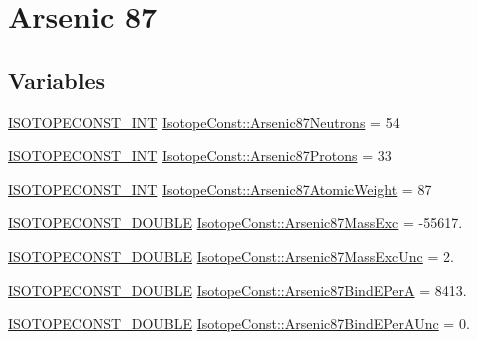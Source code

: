 \hypertarget{group___isotope_const-_arsenic-_as87}{}\section{Arsenic 87}
\label{group___isotope_const-_arsenic-_as87}
\subsection*{Variables}
\begin{DoxyCompactItemize}
\item 
\mbox{\hyperlink{group___isotope_const-_macros_ga5f18360b3e99483a35c32d789e62621c}{I\+S\+O\+T\+O\+P\+E\+C\+O\+N\+S\+T\+\_\+\+I\+NT}} \mbox{\hyperlink{group___isotope_const-_arsenic-_as87_ga909cc82bd9a37b38618f65f01b3d8ae9}{Isotope\+Const\+::\+Arsenic87\+Neutrons}} = 54
\item 
\mbox{\hyperlink{group___isotope_const-_macros_ga5f18360b3e99483a35c32d789e62621c}{I\+S\+O\+T\+O\+P\+E\+C\+O\+N\+S\+T\+\_\+\+I\+NT}} \mbox{\hyperlink{group___isotope_const-_arsenic-_as87_ga6095a6a072cbe286516dd7648e61dfca}{Isotope\+Const\+::\+Arsenic87\+Protons}} = 33
\item 
\mbox{\hyperlink{group___isotope_const-_macros_ga5f18360b3e99483a35c32d789e62621c}{I\+S\+O\+T\+O\+P\+E\+C\+O\+N\+S\+T\+\_\+\+I\+NT}} \mbox{\hyperlink{group___isotope_const-_arsenic-_as87_gaa45cd41470bbac0a3ddf76f7d94346e6}{Isotope\+Const\+::\+Arsenic87\+Atomic\+Weight}} = 87
\item 
\mbox{\hyperlink{group___isotope_const-_macros_ga8f45a7272ce02c0b4c65c44636ed719a}{I\+S\+O\+T\+O\+P\+E\+C\+O\+N\+S\+T\+\_\+\+D\+O\+U\+B\+LE}} \mbox{\hyperlink{group___isotope_const-_arsenic-_as87_gac2390a47c051b56450f92bcce052abe8}{Isotope\+Const\+::\+Arsenic87\+Mass\+Exc}} = -\/55617.
\item 
\mbox{\hyperlink{group___isotope_const-_macros_ga8f45a7272ce02c0b4c65c44636ed719a}{I\+S\+O\+T\+O\+P\+E\+C\+O\+N\+S\+T\+\_\+\+D\+O\+U\+B\+LE}} \mbox{\hyperlink{group___isotope_const-_arsenic-_as87_ga23cc9e04547da15e9c946d48afcfa07e}{Isotope\+Const\+::\+Arsenic87\+Mass\+Exc\+Unc}} = 2.
\item 
\mbox{\hyperlink{group___isotope_const-_macros_ga8f45a7272ce02c0b4c65c44636ed719a}{I\+S\+O\+T\+O\+P\+E\+C\+O\+N\+S\+T\+\_\+\+D\+O\+U\+B\+LE}} \mbox{\hyperlink{group___isotope_const-_arsenic-_as87_ga9f5e550a27cb97ce1a9f5805c76cb45b}{Isotope\+Const\+::\+Arsenic87\+Bind\+E\+PerA}} = 8413.
\item 
\mbox{\hyperlink{group___isotope_const-_macros_ga8f45a7272ce02c0b4c65c44636ed719a}{I\+S\+O\+T\+O\+P\+E\+C\+O\+N\+S\+T\+\_\+\+D\+O\+U\+B\+LE}} \mbox{\hyperlink{group___isotope_const-_arsenic-_as87_ga264d9ede97f3d4ec977dabe9b5e3e93d}{Isotope\+Const\+::\+Arsenic87\+Bind\+E\+Per\+A\+Unc}} = 0.

\end{DoxyCompactItemize}
